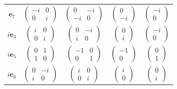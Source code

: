 \documentclass[aps,prd,twocolumn,superscriptaddress,nofootinbib,floatfix,longbibliography]{revtex4-2}
\newcommand{\e}[1]{\mathbf e_{#1}}
\begin{document}
\begin{table}[t]
\begin{ruledtabular}
\begin{tabular}{ccccc}
$\e{7}$ & $\begin{pmatrix}-i&0\\0&i\end{pmatrix}$ & $\begin{pmatrix}0&-i\\-i&0\end{pmatrix}$ & $\begin{pmatrix}0\\-i\end{pmatrix}$ & $\begin{pmatrix}-i\\0\end{pmatrix}$\\[3pt]
$i\e{4}$ & $\begin{pmatrix}i&0\\0&i\end{pmatrix}$ & $\begin{pmatrix}0&-i\\i&0\end{pmatrix}$ & $\begin{pmatrix}0\\i\end{pmatrix}$ & $\begin{pmatrix}-i\\0\end{pmatrix}$\\[3pt]
$i\e{5}$ & $\begin{pmatrix}0&1\\1&0\end{pmatrix}$ & $\begin{pmatrix}-1&0\\0&1\end{pmatrix}$ & $\begin{pmatrix}-1\\0\end{pmatrix}$ & $\begin{pmatrix}0\\1\end{pmatrix}$\\[3pt]
$i\e{6}$ & $\begin{pmatrix}0&-i\\i&0\end{pmatrix}$ & $\begin{pmatrix}i&0\\0&i\end{pmatrix}$ & $\begin{pmatrix}i\\0\end{pmatrix}$ & $\begin{pmatrix}0\\i\end{pmatrix}$\\[3pt]

\end{tabular}
\end{ruledtabular}
\end{table}
\end{document}

